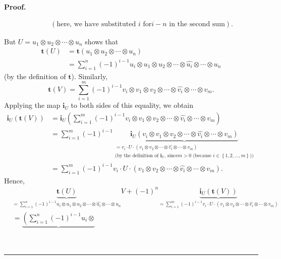 \documentclass[numbers=enddot,12pt,final,onecolumn,notitlepage]{scrartcl}%
\theoremstyle{definition}
\newenvironment{proof}[1][Proof]{\noindent\textbf{#1.} }{\ \rule{0.5em}{0.5em}}
\let\sumnonlimits\sum
\renewcommand{\sum}{\sumnonlimits\limits}
\begin{document}
\begin{proof}
{\begin{align}
&  \ \ \ \ \ \ \ \ \ \ \left(  \text{here, we have substituted }i\text{ for
}i-n\text{ in the second sum}\right)  .\nonumber
\end{align}
\par
But $U=u_{1}\otimes u_{2}\otimes\cdots\otimes u_{n}$ shows that%
\begin{align*}
\mathbf{t}\left(  U\right)   &  =\mathbf{t}\left(  u_{1}\otimes u_{2}%
\otimes\cdots\otimes u_{n}\right) \\
&  =\sum_{i=1}^{n}\left(  -1\right)  ^{i-1}u_{i}\otimes u_{1}\otimes
u_{2}\otimes\cdots\otimes\widehat{u_{i}}\otimes\cdots\otimes u_{n}%
\end{align*}
(by the definition of $\mathbf{t}$). Similarly,%
\[
\mathbf{t}\left(  V\right)  =\sum_{i=1}^{m}\left(  -1\right)  ^{i-1}%
v_{i}\otimes v_{1}\otimes v_{2}\otimes\cdots\otimes\widehat{v_{i}}%
\otimes\cdots\otimes v_{m}.
\]
Applying the map $\mathbf{i}_{U}$ to both sides of this equality, we obtain%
\begin{align*}
\mathbf{i}_{U}\left(  \mathbf{t}\left(  V\right)  \right)   &  =\mathbf{i}%
_{U}\left(  \sum_{i=1}^{m}\left(  -1\right)  ^{i-1}v_{i}\otimes v_{1}\otimes
v_{2}\otimes\cdots\otimes\widehat{v_{i}}\otimes\cdots\otimes v_{m}\right) \\
&  =\sum_{i=1}^{m}\left(  -1\right)  ^{i-1}\underbrace{\mathbf{i}_{U}\left(
v_{i}\otimes v_{1}\otimes v_{2}\otimes\cdots\otimes\widehat{v_{i}}%
\otimes\cdots\otimes v_{m}\right)  }_{\substack{=v_{i}\cdot U\cdot\left(
v_{1}\otimes v_{2}\otimes\cdots\otimes\widehat{v_{i}}\otimes\cdots\otimes
v_{m}\right)  \\\text{(by the definition of }\mathbf{i}_{U}\text{, since
}m>0\text{ (because }i\in\left\{  1,2,\ldots,m\right\}  \text{))}}}\\
&  =\sum_{i=1}^{m}\left(  -1\right)  ^{i-1}v_{i}\cdot U\cdot\left(
v_{1}\otimes v_{2}\otimes\cdots\otimes\widehat{v_{i}}\otimes\cdots\otimes
v_{m}\right)  .
\end{align*}
Hence,%
\begin{align*}
&  \underbrace{\mathbf{t}\left(  U\right)  }_{=\sum_{i=1}^{n}\left(
-1\right)  ^{i-1}u_{i}\otimes u_{1}\otimes u_{2}\otimes\cdots\otimes
\widehat{u_{i}}\otimes\cdots\otimes u_{n}}V+\left(  -1\right)  ^{n}%
\underbrace{\mathbf{i}_{U}\left(  \mathbf{t}\left(  V\right)  \right)
}_{=\sum_{i=1}^{m}\left(  -1\right)  ^{i-1}v_{i}\cdot U\cdot\left(
v_{1}\otimes v_{2}\otimes\cdots\otimes\widehat{v_{i}}\otimes\cdots\otimes
v_{m}\right)  }\\
&  =\underbrace{\left(  \sum_{i=1}^{n}\left(  -1\right)  ^{i-1}u_{i}\otimes
}
\end{align*}}
\end{proof}
\end{document}
